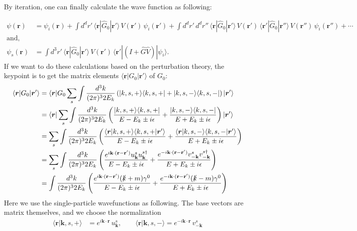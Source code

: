\documentclass{article}
\numberwithin{equation}{section}
\begin{document}
By iteration, one can finally calculate the wave function as following: 

\begin{align}
    \psi(\mathbf{r}) &= \psi_i(\mathbf{r}) 
    + \int d^d r' \, \langle \mathbf{r} | \hat{G}_0 | \mathbf{r}' \rangle \, V(\mathbf{r}') \, \psi_i(\mathbf{r}')
    + \int d^d r' \, d^d r'' \, \langle \mathbf{r} | \hat{G}_0 | \mathbf{r}' \rangle \, V(\mathbf{r}') \, \langle \mathbf{r}' | \hat{G}_0 | \mathbf{r}'' \rangle \, V(\mathbf{r}'') \, \psi_i(\mathbf{r}'')
    + \cdots\\
    \text{and},\nonumber\\
    \psi_s(\mathbf{r}) &= \int d^3 r' \, \langle \mathbf{r} | \hat{G}_0 | \mathbf{r}' \rangle \, V(\mathbf{r}') \, \langle \mathbf{r}' | (\hat{I} + \hat{G} \hat{V}) | \psi_i \rangle.
\end{align}
If we want to do these calculations based on the perturbation theory, the keypoint is to get the matrix elements $\langle \boldsymbol{r}| G_0 |\boldsymbol{r}'\rangle$ of $G_0$: 
\begin{align}
    \langle \boldsymbol{r}| G_0 |\boldsymbol{r}'\rangle&=\langle\boldsymbol{r}|G_0 \sum_s\int\frac{d^3k}{(2\pi)^3 2E_k}\left(|k,s,+\rangle\langle k,s,+|+|k,s,-\rangle\langle k,s,-|\right) |\boldsymbol{r}'\rangle\nonumber\\
    &=\langle\boldsymbol{r}| \sum_s\int  \frac{d^3k}{(2\pi)^32E_k} \left(\frac{|k,s,+\rangle\langle k,s,+|}{E - E_k \pm i\epsilon}+ \frac{|k,s,-\rangle\langle k,s,-|}{E + E_k \pm i\epsilon}\right) |\boldsymbol{r}'\rangle\nonumber\\
    &=\sum_s\int  \frac{d^3k}{(2\pi)^32E_k}\left(\frac{\langle\boldsymbol{r}|k,s,+\rangle\langle k,s,+|\boldsymbol{r}'\rangle}{E - E_k \pm i\epsilon}+ \frac{\langle\boldsymbol{r}|k,s,-\rangle\langle k,s,-|\boldsymbol{r}'\rangle}{E + E_k \pm i\epsilon}\right)\nonumber\\
    &=\sum_s\int  \frac{d^3k}{(2\pi)^32E_k}\left(\frac{e^{i \mathbf{k} \cdot (\mathbf{r}-\mathbf{r}')}u^s_{\mathbf{k}} u^{s\dagger}_{\mathbf{k}}}{E - E_k \pm i\epsilon}+ \frac{e^{-i \mathbf{k} \cdot (\mathbf{r}-\mathbf{r}')}v^s_{\mathbf{-k}} v^{s\dagger}_{\mathbf{-k}}}{E + E_k \pm i\epsilon}\right)\nonumber\\
    &=\int  \frac{d^3k}{(2\pi)^32E_k}\left(\frac{e^{i \mathbf{k} \cdot (\mathbf{r}-\mathbf{r}')}(\slashed{k} + m)\gamma^0}{E - E_k \pm i\epsilon}+ \frac{e^{-i \mathbf{k} \cdot (\mathbf{r}-\mathbf{r}')}(\slashed{k} - m)\gamma^0}{E + E_k \pm i\epsilon}\right)\label{G0expend}
\end{align}
Here we use the single-particle wavefunctions as following. The base vectors are matrix themselves, and we choose the normalization
\begin{align}
    \langle \mathbf{r} | \mathbf{k}, s, +\rangle &= 
    e^{i \mathbf{k} \cdot \mathbf{r}}\, u^s_{\mathbf{k}},\qquad \langle \mathbf{r} | \mathbf{k}, s, - \rangle = 
    e^{-i \mathbf{k} \cdot \mathbf{r}} \, v^s_{-\mathbf{k}}
\end{align}
\end{document}
